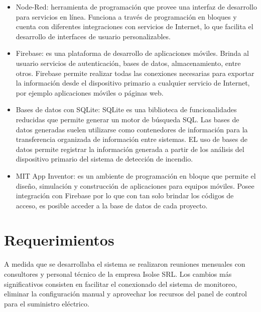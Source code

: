 \begin{itemize}
\item Node-Red: herramienta de programación que provee una interfaz de desarrollo para servicios en línea. Funciona a través de programación en bloques y cuenta con diferentes integraciones con servicios de Internet,  lo que facilita el desarrollo de interfaces de usuario personalizables.    

\item Firebase: es una plataforma de desarrollo de aplicaciones móviles. Brinda al usuario servicios de autenticación, bases de datos, almacenamiento, entre otros. Firebase permite realizar todas las conexiones necesarias para exportar la información desde el dispositivo primario a cualquier servicio de Internet, por ejemplo aplicaciones móviles o páginas web. 

\item Bases de datos con SQLite: SQLite es una biblioteca de funcionalidades reducidas que permite generar un motor de búsqueda SQL. Las bases de datos generadas suelen utilizarse como contenedores de información para la transferencia organizada de información entre sistemas. EL uso de bases de datos permite registrar la información generada a partir de los análisis del dispositivo primario del sistema de detección de incendio.

\item MIT App Inventor: es un ambiente de programación en bloque que permite el diseño, simulación y construcción de aplicaciones para equipos móviles. Posee integración con Firebase por lo que con tan solo brindar los códigos de acceso, es posible acceder a la base de datos de cada proyecto.      
\end{itemize}

\section{Requerimientos}

A medida que se desarrollaba el sistema se realizaron reuniones mensuales con consultores y personal técnico de la empresa Isolse SRL. Los cambios más significativos consisten en facilitar el conexionado del sistema de monitoreo, eliminar la configuración manual y aprovechar los recursos del panel de control para el suministro eléctrico.   


